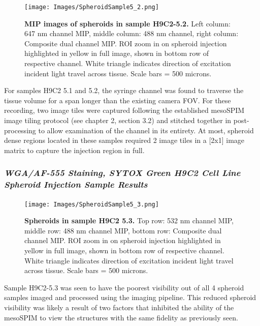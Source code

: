 \begin{figure}[H]
\centering
\texttt{[image: Images/SpheroidSample5\_2.png]}
\caption{\textbf{MIP images of spheroids in sample H9C2-5.2.} Left column: 647 nm channel MIP, middle column: 488 nm channel, right column: Composite dual channel MIP. ROI zoom in on spheroid injection highlighted in yellow in full image, shown in bottom row of respective channel. White triangle indicates direction of excitation incident light travel across tissue. Scale bars = 500 microns.}
\label{fig:enter-label}
\end{figure}
\medskip

For samples H9C2 5.1 and 5.2, the syringe channel was found to traverse the tissue volume for a span longer than the existing camera FOV. For these recording, two image tiles were captured following the established mesoSPIM image tiling protocol (see chapter 2, section 3.2) and stitched together in post-processing to allow examination of the channel in its entirety. At most, spheroid dense regions located in these samples required 2 image tiles in a [2x1] image matrix to capture the injection region in full.

\subsubsection{\textit{WGA/AF-555 Staining, SYTOX Green H9C2 Cell Line Spheroid Injection Sample Results}}

\begin{figure}[H]
\centering
\texttt{[image: Images/SpheroidSample5\_3.png]}
\caption{\textbf{Spheroids in sample H9C2 5.3.} Top row: 532 nm channel MIP, middle row: 488 nm channel MIP, bottom row: Composite dual channel MIP. ROI zoom in on spheroid injection highlighted in yellow in full image, shown in bottom row of respective channel. White triangle indicates direction of excitation incident light travel across tissue. Scale bars = 500 microns.}
\label{fig:enter-label}
\end{figure}
\medskip

Sample H9C2-5.3 was seen to have the poorest visibility out of all 4 spheroid samples imaged and processed using the imaging pipeline. This reduced spheroid visibility was likely a result of two factors that inhibited the ability of the mesoSPIM to view the structures with the same fidelity as previously seen. 

